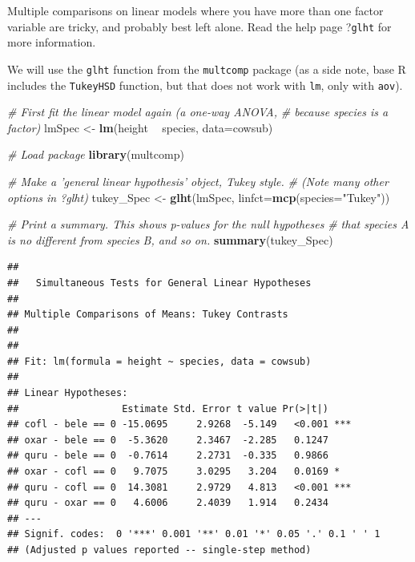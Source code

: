 \documentclass[]{book}
\newenvironment{Shaded}{\begin{snugshade}}{\end{snugshade}}
\newcommand{\CommentTok}[1]{\textcolor[rgb]{0.56,0.35,0.01}{\textit{#1}}}
\newcommand{\DataTypeTok}[1]{\textcolor[rgb]{0.13,0.29,0.53}{#1}}
\newcommand{\KeywordTok}[1]{\textcolor[rgb]{0.13,0.29,0.53}{\textbf{#1}}}
\newcommand{\NormalTok}[1]{#1}
\newcommand{\OperatorTok}[1]{\textcolor[rgb]{0.81,0.36,0.00}{\textbf{#1}}}
\newcommand{\StringTok}[1]{\textcolor[rgb]{0.31,0.60,0.02}{#1}}
\let\BeginKnitrBlock\begin \let\EndKnitrBlock\end
\begin{document}
\BeginKnitrBlock{rmdcaution}
Multiple comparisons on linear models where you have more than one factor variable are tricky, and probably best left alone. Read the help page ?\texttt{glht} for more information.
\EndKnitrBlock{rmdcaution}

We will use the \texttt{glht} function from the \texttt{multcomp} package (as a side note, base R includes the \texttt{TukeyHSD} function, but that does not work with \texttt{lm}, only with \texttt{aov}).

\begin{Shaded}
\begin{Highlighting}[]
\CommentTok{# First fit the linear model again (a one-way ANOVA, }
\CommentTok{# because species is a factor)}
\NormalTok{lmSpec <-}\StringTok{ }\KeywordTok{lm}\NormalTok{(height }\OperatorTok{~}\StringTok{ }\NormalTok{species, }\DataTypeTok{data=}\NormalTok{cowsub)}

\CommentTok{# Load package}
\KeywordTok{library}\NormalTok{(multcomp)}

\CommentTok{# Make a 'general linear hypothesis' object, Tukey style.}
\CommentTok{# (Note many other options in ?glht)}
\NormalTok{tukey_Spec <-}\StringTok{ }\KeywordTok{glht}\NormalTok{(lmSpec, }\DataTypeTok{linfct=}\KeywordTok{mcp}\NormalTok{(}\DataTypeTok{species=}\StringTok{"Tukey"}\NormalTok{))}

\CommentTok{# Print a summary. This shows p-values for the null hypotheses}
\CommentTok{# that species A is no different from species B, and so on.}
\KeywordTok{summary}\NormalTok{(tukey_Spec)}
\end{Highlighting}
\end{Shaded}

\begin{verbatim}
## 
##   Simultaneous Tests for General Linear Hypotheses
## 
## Multiple Comparisons of Means: Tukey Contrasts
## 
## 
## Fit: lm(formula = height ~ species, data = cowsub)
## 
## Linear Hypotheses:
##                  Estimate Std. Error t value Pr(>|t|)    
## cofl - bele == 0 -15.0695     2.9268  -5.149   <0.001 ***
## oxar - bele == 0  -5.3620     2.3467  -2.285   0.1247    
## quru - bele == 0  -0.7614     2.2731  -0.335   0.9866    
## oxar - cofl == 0   9.7075     3.0295   3.204   0.0169 *  
## quru - cofl == 0  14.3081     2.9729   4.813   <0.001 ***
## quru - oxar == 0   4.6006     2.4039   1.914   0.2434    
## ---
## Signif. codes:  0 '***' 0.001 '**' 0.01 '*' 0.05 '.' 0.1 ' ' 1
## (Adjusted p values reported -- single-step method)
\end{verbatim}
\end{document}
